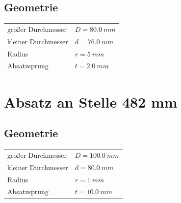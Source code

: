 \documentclass[11pt,a4paper]{article}
\begin{document}
\subsection*{Geometrie}

\begin{center}
\begin{tabular}{|ll|}
großer Durchmesser & $D =80.0\ mm$ \\
kleiner Durchmesser & $d =76.0\ mm$ \\
Radius & $r =5\ mm$ \\
Absatzsprung & $t =2.0\ mm$
\end{tabular}
\end{center}

\section*{Absatz an Stelle 482 mm}

\subsection*{Geometrie}

\begin{center}
\begin{tabular}{|ll|}
großer Durchmesser & $D =100.0\ mm$ \\
kleiner Durchmesser & $d =80.0\ mm$ \\
Radius & $r =1\ mm$ \\
Absatzsprung & $t =10.0\ mm$
\end{tabular}
\end{center}
\end{document}
